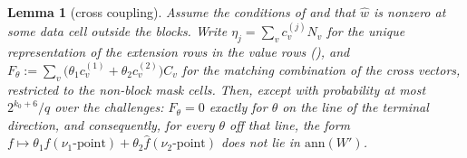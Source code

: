 \documentclass{article}
\newtheorem{lemma}{Lemma}
\theoremstyle{definition}
\begin{document}
\begin{lemma}[cross coupling]\label{cond:cross2}
Assume the conditions of  and that $\hat{w}$ is nonzero at some data cell outside the blocks. Write $\eta_j = \sum_v c^{(j)}_v N_v$ for the unique representation of the extension rows in the value rows (), and $F_\theta := \sum_v \big(\theta_1 c^{(1)}_v + \theta_2 c^{(2)}_v\big) C_v$ for the matching combination of the cross vectors, restricted to the non-block mask cells. Then, except with probability at most $2^{k_0 + 6}/q$ over the challenges: $F_\theta = 0$ exactly for $\theta$ on the line of the terminal direction, and consequently, for every $\theta$ off that line, the form $f \mapsto \theta_1 \hat{f}(\nu_1\text{-point}) + \theta_2 \hat{f}(\nu_2\text{-point})$ does not lie in $\mathrm{ann}(W')$.
\end{lemma}
\end{document}
